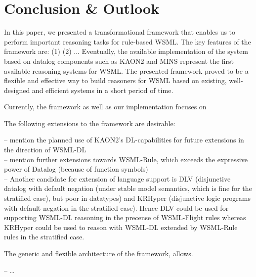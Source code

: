 \section{Conclusion \& Outlook\label{sec:outlook}}
In this paper, we presented a transformational framework that
enables us to perform important reasoning tasks for rule-based
WSML. The key features of the framework are: (1) (2) ...
Eventually, the available implementation of the system based on
datalog components such as KAON2 and MINS represent the first
available reasoning systems for WSML. The presented framework
proved to be a flexible and effective way to build reasoners for
WSML based on existing, well-designed and efficient systems in a
short period of time.

 Currently, the framework as well as our
implementation focuses on

The following extensions to the framework are desirable:

-- mention the planned use of KAON2's DL-capabilities for future extensions in the direction of WSML-DL \\
-- mention further extensions towards WSML-Rule, which exceeds the expressive power of Datalog (because of function symbols)\\
-- Another candidate for extension of language support is DLV
(disjunctive datalog with default negation (under stable model
semantics, which is fine for the stratified case), but poor in
datatypes) and KRHyper (disjunctive logic programs with default
negation in the stratified case). Hence DLV could be used for
supporting WSML-DL reasoning in the precense of WSML-Flight rules
whereas KRHyper could be used to reason with WSML-DL extended by
WSML-Rule rules in the stratified case.

The generic and flexible architecture of the framework, allows.

-- \dots

